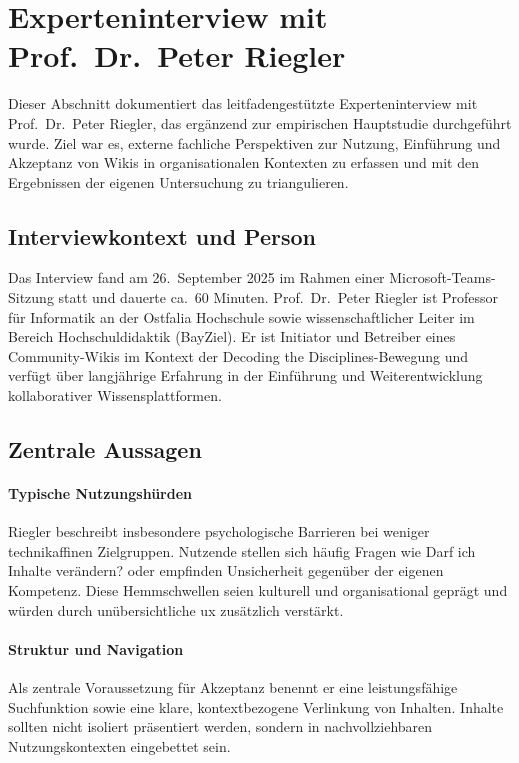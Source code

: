\section{Experteninterview mit Prof.~Dr.~Peter Riegler}
\label{sec:AA-01_riegler}

Dieser Abschnitt dokumentiert das leitfadengestützte Experteninterview mit Prof.~Dr.~Peter Riegler, das ergänzend zur empirischen Hauptstudie durchgeführt wurde. Ziel war es, externe fachliche Perspektiven zur Nutzung, Einführung und Akzeptanz von Wikis in organisationalen Kontexten zu erfassen und mit den Ergebnissen der eigenen Untersuchung zu triangulieren.

\subsection{Interviewkontext und Person}

Das Interview fand am 26.~September 2025 im Rahmen einer Microsoft-Teams-Sitzung statt und dauerte ca.~60 Minuten. Prof.~Dr.~Peter Riegler ist Professor für Informatik an der Ostfalia Hochschule sowie wissenschaftlicher Leiter im Bereich Hochschuldidaktik (BayZiel). Er ist Initiator und Betreiber eines Community-Wikis im Kontext der \glqq Decoding the Disciplines\grqq{}-Bewegung und verfügt über langjährige Erfahrung in der Einführung und Weiterentwicklung kollaborativer Wissensplattformen.

\subsection{Zentrale Aussagen}

\paragraph{Typische Nutzungshürden}
Riegler beschreibt insbesondere psychologische Barrieren bei weniger technikaffinen Zielgruppen. Nutzende stellen sich häufig Fragen wie \glqq Darf ich Inhalte verändern?\grqq{} oder empfinden Unsicherheit gegenüber der eigenen Kompetenz. Diese Hemmschwellen seien kulturell und organisational geprägt und würden durch unübersichtliche \Gls{ux} zusätzlich verstärkt.

\paragraph{Struktur und Navigation}
Als zentrale Voraussetzung für Akzeptanz benennt er eine leistungsfähige Suchfunktion sowie eine klare, kontextbezogene Verlinkung von Inhalten. Inhalte sollten nicht isoliert präsentiert werden, sondern in nachvollziehbaren Nutzungskontexten eingebettet sein.


